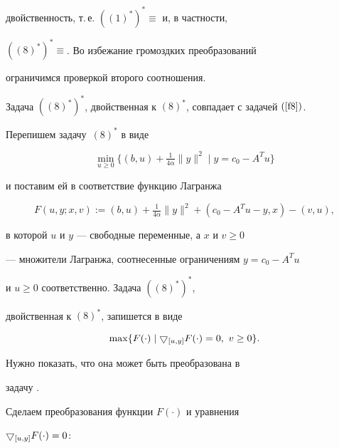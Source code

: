 двойственность, т.\,е.{} $((1)^*)^*\equiv$ и, в частности,


$((8)^*)^*\equiv$. Во избежание громоздких преобразований


ограничимся проверкой второго соотношения.





\begin{lem}


\label{l2}


Задача $((8)^*)^*$, двойственная к $(8)^*$, совпадает с задачей $\rf{f8}$.


\end{lem}





\begin{pf}


Перепишем задачу~$(8)^*$ в виде


$$


\min_{u\ge 0} \{(b, u) + \tfrac{1}{4\alpha}


\|y\|^2 \mid y = c_0-A^Tu \}


$$


и поставим ей в соответствие функцию Лагранжа


$$


F(u,y;x,v):= (b, u) + \tfrac{1}{4\alpha} \|y\|^2 +


(c_0-A^Tu -y,x)-(v,u),


$$


в которой $u$ и $y$ --- свободные переменные, а $x$ и $v\ge 0$


--- множители Лагранжа, соотнесенные ограничениям $y =c_0-A^Tu$


и $u\ge 0$ соответственно. Задача $((8)^*)^*$,


двойственная к $(8)^*$, запишется в виде


$$


\max \{F(\cdot) \mid \btd_{[u,y]}F(\cdot)=0, \ v\ge 0\}.


$$


Нужно показать, что она может быть преобразована в


задачу .





Сделаем преобразования функции $F(\cdot)$ и уравнения


$\bigtriangledown_{[u,y]} F(\cdot)=0$:


\begin{gather*}



\end{gather*}
\end{pf}
